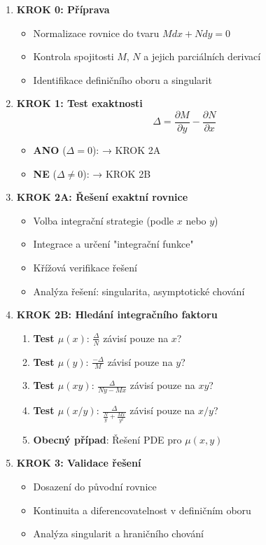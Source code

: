 \begin{method}
\label{met:rozhodovaci-strom-expert}
\begin{enumerate}
\item \textbf{KROK 0: Příprava}
\begin{itemize}
\item Normalizace rovnice do tvaru $M dx + N dy = 0$
\item Kontrola spojitosti $M$, $N$ a jejich parciálních derivací
\item Identifikace definičního oboru a singularit
\end{itemize}

\item \textbf{KROK 1: Test exaktnosti}
\[
\Delta = \frac{\partial M}{\partial y} - \frac{\partial N}{\partial x}
\]
\begin{itemize}
\item \textbf{ANO} ($\Delta = 0$): → KROK 2A
\item \textbf{NE} ($\Delta \neq 0$): → KROK 2B
\end{itemize}

\item \textbf{KROK 2A: Řešení exaktní rovnice}
\begin{itemize}
\item Volba integrační strategie (podle $x$ nebo $y$)
\item Integrace a určení "integrační funkce"
\item Křížová verifikace řešení
\item Analýza řešení: singularita, asymptotické chování
\end{itemize}

\item \textbf{KROK 2B: Hledání integračního faktoru}
\begin{enumerate}
\item \textbf{Test $\mu(x)$}: $\frac{\Delta}{N}$ závisí pouze na $x$?
\item \textbf{Test $\mu(y)$}: $\frac{-\Delta}{M}$ závisí pouze na $y$?
\item \textbf{Test $\mu(xy)$}: $\frac{\Delta}{Ny - Mx}$ závisí pouze na $xy$?
\item \textbf{Test $\mu(x/y)$}: $\frac{\Delta}{\frac{N}{y} + \frac{Mx}{y^2}}$ závisí pouze na $x/y$?
\item \textbf{Obecný případ}: Řešení PDE pro $\mu(x,y)$
\end{enumerate}

\item \textbf{KROK 3: Validace řešení}
\begin{itemize}
\item Dosazení do původní rovnice
\item Kontinuita a diferencovatelnost v definičním oboru
\item Analýza singularit a hraničního chování
\end{itemize}
\end{enumerate}
\end{method}

